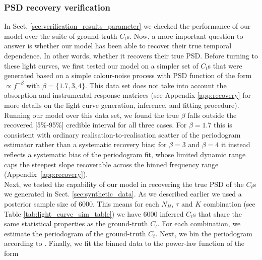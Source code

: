 \documentclass{aa}
\begin{document}
\subsubsection{PSD recovery verification}
\label{sec:verification_results_psd}
In Sect. \ref{sec:verification_results_parameter} we checked the performance of our model
over the suite of ground-truth $C_t$s. Now, a more important question to answer is
whether our model has been able to recover their true temporal dependence. In other words, whether it recovers their true PSD. Before turning to these light curves, we
first tested our model on a simpler set of $C_t$s that were generated based on a simple
colour-noise process with PSD function of the form $\propto f^{-\beta}$ with $\beta = \{1.7, 3, 4\}$. This data set does not take into account the absorption and instrumental response matrices (see Appendix \ref{app:recovery} for more details on the light curve generation, inference, and fitting procedure). Running our model over this data set, we found the true $\beta$ falls outside the recovered [5\%-95\%] credible interval for all three cases. For $\beta = 1.7$ this is consistent with ordinary realisation-to-realisation scatter of the periodogram estimator rather than a systematic recovery bias; for $\beta = 3$ and $\beta = 4$ it instead reflects a systematic bias of the periodogram fit, whose limited dynamic range caps the steepest slope recoverable across the binned frequency range (Appendix~\ref{app:recovery}). \\
Next, we tested the capability of our model in recovering the true PSD of the $C_t$s we generated in Sect. \ref{sec:synthetic_data}. As we described earlier we used a posterior sample size of 6000. This means for each $N_H$, $\tau$ and $K$ combination (see Table \ref{tab:light_curve_sim_table})
we have 6000 inferred $C_t$s that share the same statistical properties as the
ground-truth $C_t$. For each combination, we estimate the periodogram of the
ground-truth $C_t$. Next, we bin the periodogram according to \citet{Vaughan2003}. Finally, we fit the binned data to the power-law function of the form
\end{document}
